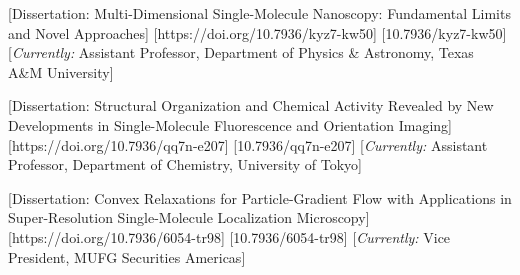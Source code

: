 \begin{etaremune}[
  leftmargin=9mm, 
  labelsep=1em,
  topsep=0pt, %
  itemsep=0pt %
]
\item {}
  [Dissertation: Multi-Dimensional Single-Molecule Nanoscopy: Fundamental Limits and Novel Approaches]
  [https://doi.org/10.7936/kyz7-kw50]
  [10.7936/kyz7-kw50]
  [\textit{Currently:} Assistant Professor, Department of Physics \& Astronomy, Texas A\&M University]

\item {}
  [Dissertation: Structural Organization and Chemical Activity Revealed by New Developments in Single-Molecule Fluorescence and Orientation Imaging]
  [https://doi.org/10.7936/qq7n-e207]
  [10.7936/qq7n-e207]
  [\textit{Currently:} Assistant Professor, Department of Chemistry, University of Tokyo]

\item {}
  [Dissertation: Convex Relaxations for Particle-Gradient Flow with Applications in Super-Resolution Single-Molecule Localization Microscopy]
  [https://doi.org/10.7936/6054-tr98]
  [10.7936/6054-tr98]
  [\textit{Currently:} Vice President, MUFG Securities Americas]

\end{etaremune}

